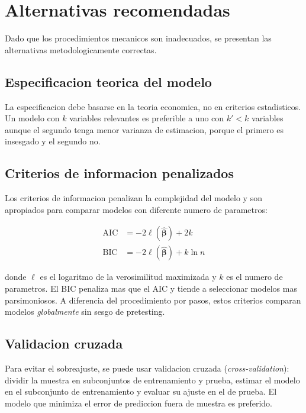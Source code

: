 \documentclass[12pt, letterpaper]{article}
\theoremstyle{remark}
\begin{document}
\section{Alternativas recomendadas}

Dado que los procedimientos mecanicos son inadecuados, se presentan las
alternativas metodologicamente correctas.

\subsection{Especificacion teorica del modelo}

La especificacion debe basarse en la teoria economica, no en criterios
estadisticos. Un modelo con $k$ variables relevantes es preferible a uno
con $k' < k$ variables aunque el segundo tenga menor varianza de estimacion,
porque el primero es insesgado y el segundo no.

\subsection{Criterios de informacion penalizados}

Los criterios de informacion penalizan la complejidad del modelo y son
apropiados para comparar modelos con diferente numero de parametros:

\begin{align}
  \text{AIC} &= -2\ell(\hat{\boldsymbol\beta}) + 2k
  \label{eq:AIC}\\
  \text{BIC} &= -2\ell(\hat{\boldsymbol\beta}) + k\ln n
  \label{eq:BIC}
\end{align}

donde $\ell$ es el logaritmo de la verosimilitud maximizada y $k$ es el
numero de parametros. El BIC penaliza mas que el AIC y tiende a seleccionar
modelos mas parsimoniosos. A diferencia del procedimiento por pasos, estos
criterios comparan modelos \emph{globalmente} sin sesgo de pretesting.

\subsection{Validacion cruzada}

Para evitar el sobreajuste, se puede usar validacion cruzada (\textit{cross-validation}):
dividir la muestra en subconjuntos de entrenamiento y prueba, estimar el
modelo en el subconjunto de entrenamiento y evaluar su ajuste en el de prueba.
El modelo que minimiza el error de prediccion fuera de muestra es preferido.
\end{document}
